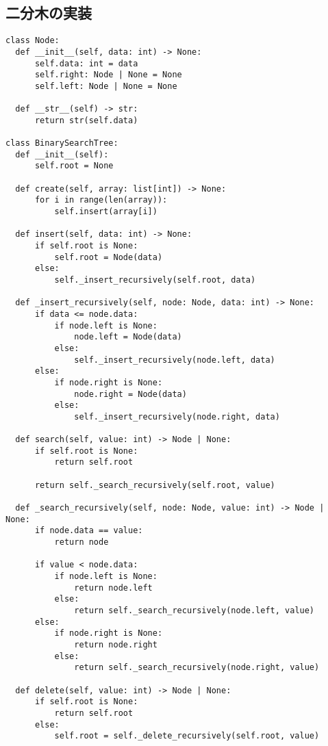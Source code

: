 \documentclass{jlreq}
\begin{document}
\subsection{二分木の実装}
\begin{lstlisting}[caption=二分木の実装, frame=TRBL, label={binary_tree}]
class Node:
  def __init__(self, data: int) -> None:
      self.data: int = data
      self.right: Node | None = None
      self.left: Node | None = None
      
  def __str__(self) -> str:
      return str(self.data)
  
class BinarySearchTree:
  def __init__(self):
      self.root = None
      
  def create(self, array: list[int]) -> None:
      for i in range(len(array)):
          self.insert(array[i])
  
  def insert(self, data: int) -> None:
      if self.root is None:
          self.root = Node(data)
      else:
          self._insert_recursively(self.root, data)
  
  def _insert_recursively(self, node: Node, data: int) -> None:
      if data <= node.data:
          if node.left is None:
              node.left = Node(data)
          else:
              self._insert_recursively(node.left, data)
      else:
          if node.right is None:
              node.right = Node(data)
          else:
              self._insert_recursively(node.right, data)
  
  def search(self, value: int) -> Node | None:
      if self.root is None:
          return self.root
      
      return self._search_recursively(self.root, value)
      
  def _search_recursively(self, node: Node, value: int) -> Node | None:
      if node.data == value:
          return node
      
      if value < node.data:
          if node.left is None:
              return node.left
          else:
              return self._search_recursively(node.left, value)
      else:
          if node.right is None:
              return node.right
          else:
              return self._search_recursively(node.right, value)
  
  def delete(self, value: int) -> Node | None:
      if self.root is None:
          return self.root
      else:
          self.root = self._delete_recursively(self.root, value)
  

\end{lstlisting}
\end{document}
